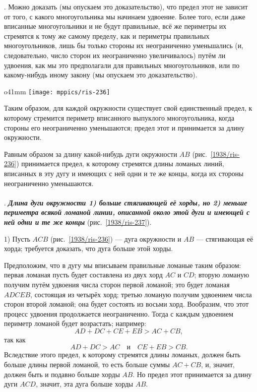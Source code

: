 {\small
\smallskip
{}.
Можно доказать (мы опускаем это доказательство), что предел этот не зависит от того, с какого многоугольника мы начинаем удвоение.
Более того, если даже вписанные многоугольники и не будут правильные, всё же периметры их стремятся к тому же самому пределу, как и периметры правильных многоугольников, лишь бы только стороны их неограниченно уменьшались (и, следовательно, число сторон их неограниченно увеличивалось) путём ли удвоения, как мы это предполагали для правильных многоугольников, или по какому-нибудь иному закону (мы опускаем это доказательство).

}

{

\begin{wrapfigure}[7]{o}{41mm}
\centering
\texttt{[image: mppics/ris-236]}
\caption{}\label{1938/ris-236}
\end{wrapfigure}

Таким образом, для каждой окружности существует свой единственный предел, к которому стремится периметр вписанного выпуклого многоугольника, когда стороны его неограниченно уменьшаются;
предел этот и принимается за длину окружности.



Равным образом за длину какой-нибудь дуги окружности $AB$ (рис.~\ref{1938/ris-236}) принимается предел, к которому стремятся длины ломаных линий, вписанных в эту дугу и имеющих с ней одни и те же концы, 
когда их стороны неограниченно уменьшаются.

}

\paragraph{}\label{1938/235}
.
\textbf{\emph{Длина дуги окружности
1) больше стягивающей её хорды, но 2) меньше периметра всякой ломаной линии, описанной около этой дуги и имеющей с ней одни и те же концы}} (рис.~\ref{1938/ris-237}).


1) Пусть $ACB$ (рис.~\ref{1938/ris-236}) — дуга окружности и $AB$ — стягивающая её хорда;
требуется доказать, что дуга больше этой хорды.



Предположим, что в дугу мы вписываем правильные ломаные таким образом:
первая ломаная пусть будет составлена из двух хорд $AC$ и $CD$;
вторую ломаную получим путём удвоения числа сторон первой ломаной;
это будет ломаная $ADCEB$, состоящая из четырёх хорд;
третью ломаную получим удвоением числа сторон второй ломаной;
она будет состоять из восьми хорд.
Вообразим, что этот процесс удвоения продолжается неограниченно.
Тогда с каждым удвоением периметр ломаной будет возрастать;
например:
\[AD+DC+CE+EB>AC+CB,\]
так как
\[AD+DC>AC\quad\text{и}\quad CE+EB>CB.\]
Вследствие этого предел, к которому стремятся длины ломаных, должен быть больше длины первой ломаной, то есть больше суммы $AC+CB$, и, значит, должен быть и подавно больше хорды $AB$.
Но предел этот принимается за длину дуги $ACD$, значит, эта дуга больше хорды $AB$.

